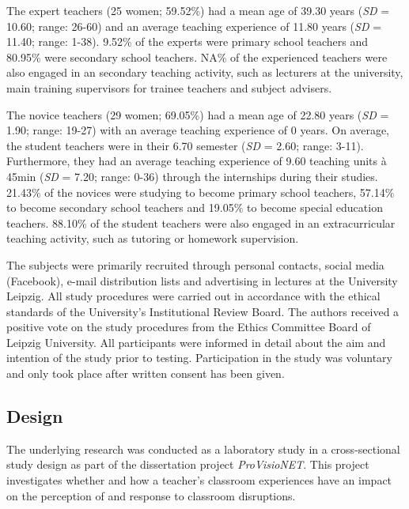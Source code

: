 \documentclass[
  man]{apa6}
\begin{document}
The expert teachers (25 women; 59.52\%) had a mean age of 39.30 years (\emph{SD} = 10.60; range: 26-60) and an average teaching experience of 11.80 years (\emph{SD} = 11.40; range: 1-38).
9.52\% of the experts were primary school teachers and 80.95\% were secondary school teachers. NA\% of the experienced teachers were also engaged in an secondary teaching activity, such as lecturers at the university, main training supervisors for trainee teachers and subject advisers.

The novice teachers (29 women; 69.05\%) had a mean age of 22.80 years (\emph{SD} = 1.90; range: 19-27) with an average teaching experience of 0 years. On average, the student teachers were in their 6.70 semester (\emph{SD} = 2.60; range: 3-11). Furthermore, they had an average teaching experience of 9.60 teaching units à 45min (\emph{SD} = 7.20; range: 0-36) through the internships during their studies.
21.43\% of the novices were studying to become primary school teachers, 57.14\% to become secondary school teachers and 19.05\% to become special education teachers. 88.10\% of the student teachers were also engaged in an extracurricular teaching activity, such as tutoring or homework supervision.

The subjects were primarily recruited through personal contacts, social media (Facebook), e-mail distribution lists and advertising in lectures at the University Leipzig. All study procedures were carried out in accordance with the ethical standards of the University's Institutional Review Board. The authors received a positive vote on the study procedures from the Ethics Committee Board of Leipzig University. All participants were informed in detail about the aim and intention of the study prior to testing. Participation in the study was voluntary and only took place after written consent has been given.

\subsection{Design}\label{design}

The underlying research was conducted as a laboratory study in a cross-sectional study design as part of the dissertation project \emph{ProVisioNET}. This project investigates whether and how a teacher's classroom experiences have an impact on the perception of and response to classroom disruptions.
\end{document}
